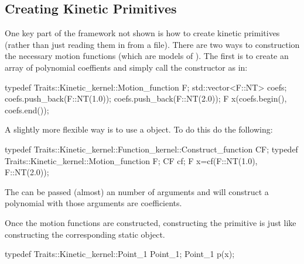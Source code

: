 \subsection{Creating Kinetic Primitives}

One key part of the framework not shown is how to create kinetic
primitives (rather than just reading them in from a file). There are
two ways to construction the necessary motion functions (which are
models of ). The first is to
create an array of polynomial coeffients and simply call the
constructor as in:
\begin{ccExampleCode}
typedef Traits::Kinetic_kernel::Motion_function F;
std::vector<F::NT> coefs;
coefs.push_back(F::NT(1.0));
coefs.push_back(F::NT(2.0));
F x(coefs.begin(), coefs.end());
\end{ccExampleCode}

A slightly more flexible way is to use a
 object. To do this do the following:
\begin{ccExampleCode}
typedef Traits::Kinetic_kernel::Function_kernel::Construct_function
CF; typedef Traits::Kinetic_kernel::Motion_function F; CF cf; F
x=cf(F::NT(1.0), F::NT(2.0));
\end{ccExampleCode}
The  can be passed
(almost) an number of arguments and will construct a polynomial with
those arguments are coefficients.

Once the motion functions are constructed, constructing the primitive
is just like constructing the corresponding static object.
\begin{ccExampleCode}
typedef Traits::Kinetic_kernel::Point_1 Point_1;
Point_1 p(x);
\end{ccExampleCode}
